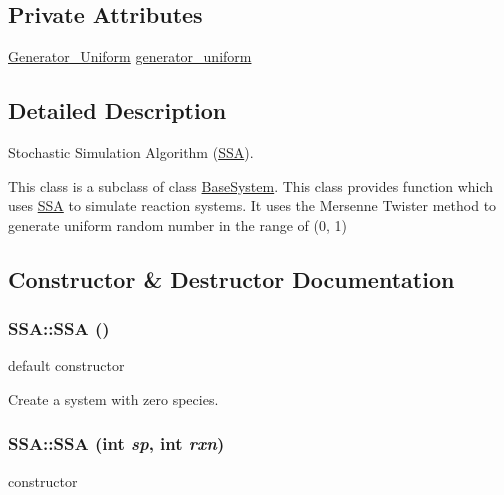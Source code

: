 \subsection*{Private Attributes}
\begin{CompactItemize}
\item 
\hyperlink{class_s_s_a_4684d2b7d06ade41d3f00fe2720602b6}{Generator\_\-Uniform} \hyperlink{class_s_s_a_744b27ebbc7e43d58ac2a980891442db}{generator\_\-uniform}
\end{CompactItemize}


\subsection{Detailed Description}
Stochastic Simulation Algorithm (\hyperlink{class_s_s_a}{SSA}). 

This class is a subclass of class \hyperlink{class_base_system}{BaseSystem}. This class provides function which uses \hyperlink{class_s_s_a}{SSA} to simulate reaction systems. It uses the Mersenne Twister method to generate uniform random number in the range of (0, 1) 

\subsection{Constructor \& Destructor Documentation}
\hypertarget{class_s_s_a_7f54a44f351cc190c7977ee700842e1a}{
\subsubsection{\setlength{\rightskip}{0pt plus 5cm}SSA::SSA ()}}
\label{class_s_s_a_7f54a44f351cc190c7977ee700842e1a}


default constructor 

Create a system with zero species. \hypertarget{class_s_s_a_156000a79285be59dbbc3728e84b5249}{
\subsubsection{\setlength{\rightskip}{0pt plus 5cm}SSA::SSA (int {\em sp}, \/  int {\em rxn})}}
\label{class_s_s_a_156000a79285be59dbbc3728e84b5249}


constructor 

